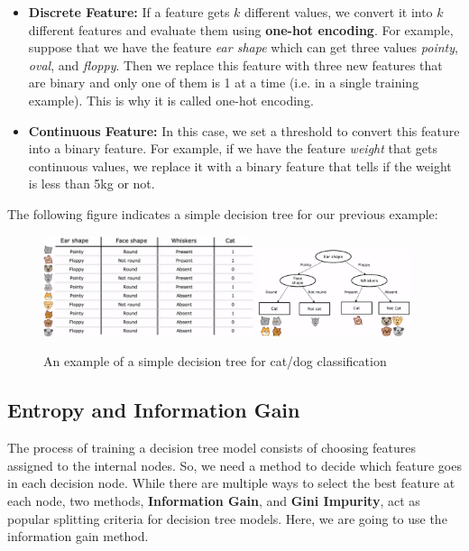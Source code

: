 \documentclass[a4paper, 12pt]{book}
\begin{document}
\begin{itemize}
    \item \textbf{Discrete Feature:} If a feature gets $k$ different values, we convert it into $k$ different features and evaluate them using \textbf{one-hot encoding}. For example, suppose that we have the feature \emph{ear shape} which can get three values \emph{pointy}, \emph{oval}, and \emph{floppy}. Then we replace this feature with three new features that are binary and only one of them is 1 at a time (i.e. in a single training example). This is why it is called one-hot encoding.
    \item \textbf{Continuous Feature:} In this case, we set a threshold to convert this feature into a binary feature. For example, if we have the feature \emph{weight} that gets continuous values, we replace it with a binary feature that tells if the weight is less than 5kg or not.
\end{itemize}

\noindent The following figure indicates a simple decision tree for our previous example:

\begin{figure} [h]
    \centering
    \includegraphics[width=0.55\textwidth]{graphics/sdt_table.png}
    \includegraphics[width=0.4\textwidth]{graphics/simple_dec_tree.png}
    \caption{An example of a simple decision tree for cat/dog classification}
\end{figure}

\subsection{Entropy and Information Gain}

The process of training a decision tree model consists of choosing features assigned to the internal nodes. So, we need a method to decide which feature goes in each decision node. While there are multiple ways to select the best feature at each node, two methods, \textbf{Information Gain}, and \textbf{Gini Impurity}, act as popular splitting criteria for decision tree models. Here, we are going to use the information gain method.
\end{document}
